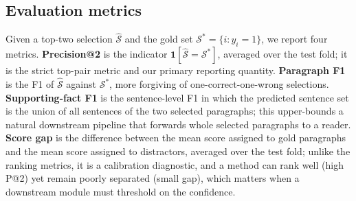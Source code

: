 \subsection{Evaluation metrics}

Given a top-two selection $\hat{\mathcal{S}}$ and the gold set
$\mathcal{S}^{*}=\{i : y_i=1\}$, we report four metrics.
\textbf{Precision@2} is the indicator $\mathbf{1}[\hat{\mathcal{S}}=\mathcal{S}^{*}]$,
averaged over the test fold; it is the strict top-pair metric and our
primary reporting quantity. \textbf{Paragraph F1} is the F1 of
$\hat{\mathcal{S}}$ against $\mathcal{S}^{*}$, more forgiving of
one-correct-one-wrong selections. \textbf{Supporting-fact F1} is the
sentence-level F1 in which the predicted sentence set is the union of
all sentences of the two selected paragraphs; this upper-bounds a
natural downstream pipeline that forwards whole selected paragraphs to
a reader. \textbf{Score gap} is the difference between the mean score
assigned to gold paragraphs and the mean score assigned to
distractors, averaged over the test fold; unlike the ranking metrics,
it is a calibration diagnostic, and a method can rank well (high P@2)
yet remain poorly separated (small gap), which matters when a
downstream module must threshold on the confidence.

